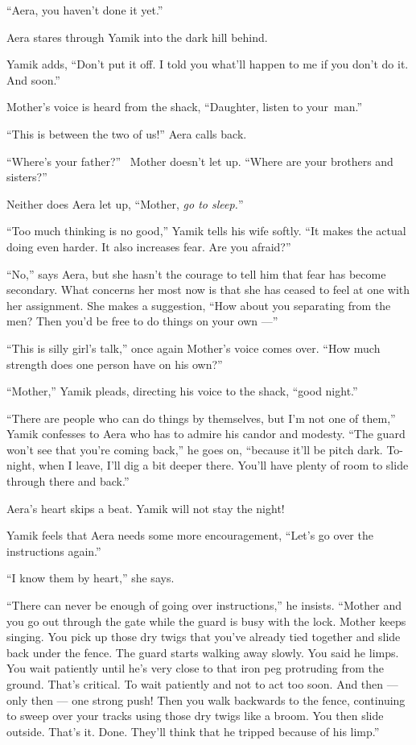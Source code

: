 \documentclass[twoside,11pt,openany]{book}
\begin{document}
{}``Aera, you haven't done it yet.''

Aera stares through Yamik into the dark hill behind.

Yamik adds, {}``Don't put it off. I told you what'll happen to me if you don't do it. And soon.''

Mother's voice is heard from the shack, ``Daughter, listen to your~man.''

``This is between the two of us!'' Aera calls back.

{}``Where's your father?'' ~Mother doesn't let up. ``Where{ }are your
brothers and sisters?''

Neither does Aera let up, ``Mother, \textit{go to sleep.}{}''

{}``Too much thinking is no good,'' Yamik tells his wife softly. ``It makes the actual doing
even harder. It also increases fear. Are you afraid?''

{}``No,'' says Aera, but she hasn't the courage to tell him that fear has become secondary. What concerns her most now
is that she has ceased to feel at one with her assignment. She makes a suggestion, ``How about you separating from the
men?  Then you'd be free to do things on your own ---''

{}``This is silly girl's talk,'' once again Mother's voice comes over. ``How much strength
does one person have on his own?''

``Mother,'' Yamik pleads, directing his voice to the shack, ``good night.''

{}``There are people who can do things by themselves, but I'm not one of
them,{}'' Yamik{ }confesses to Aera who has to admire his candor and
modesty. {}``The guard won't see that you're coming back,{}'' he goes on, ``because it'll be pitch dark. To-night,
when I leave, I'll dig a bit deeper there. You'll have plenty of room to slide through there and back.''

Aera's heart skips a beat. Yamik will not stay the night!

Yamik feels that Aera needs some more encouragement, ``Let's go over the instructions again.''

{}``I know them by heart,'' she says.

``There can never be enough of going over instructions,'' he insists.
``Mother and you go
out through the gate while the guard is busy with the lock. Mother keeps singing. You pick up those dry twigs that
you've already tied together and slide back under the fence. The guard starts walking away slowly. You said he limps.
You wait patiently until he's very close to that iron peg protruding from the ground. That's critical. To wait
patiently and not to act too soon. And then ---  only then --- one strong push! Then you walk backwards to the fence,
continuing to sweep over your tracks using those dry twigs like a broom. You
then slide outside. That's it. Done. They'll think that he tripped because
of his limp.''
\end{document}
